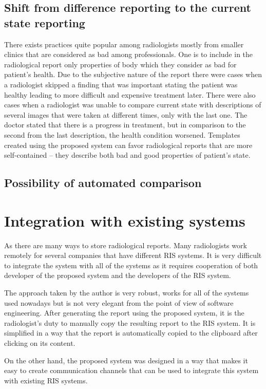 \documentclass[12pt, twoside, openany]{report}
\theoremstyle{definition}
\begin{document}
\subsection{Shift from difference reporting to the current state reporting}
There exists practices quite popular among radiologists mostly from smaller clinics that are considered as bad among professionals. One is to include in the radiological report only properties of body which they consider as bad for patient's health. Due to the subjective nature of the report there were cases when a radiologist skipped a finding that was important stating the patient was healthy leading to more difficult and expensive treatment later.
There were also cases when a radiologist was unable to compare current state with descriptions of several images that were taken at different times, only with the last one. The doctor stated that there is a progress in treatment, but in comparison to the second from the last description, the health condition worsened. \cite{risk-management}
Templates created using the proposed system can favor radiological reports that are more self-contained -- they describe both bad and good properties of patient's state.

\subsection{Possibility of automated comparison}


\section{Integration with existing systems}
As there are many ways to store radiological reports. Many radiologists work remotely for several companies that have different RIS systems. It is very difficult to integrate the system with all of the systems as it requires cooperation of both developer of the proposed system and the developers of the RIS system. 

The approach taken by the author is very robust, works for all of the systems used nowadays but is not very elegant from the point of view of software engineering. 
After generating the report using the proposed system, it is the radiologist's duty to manually copy the resulting report to the RIS system. It is simplified in a way that the report is automatically copied to the clipboard after clicking on its content.

On the other hand, the proposed system was designed in a way that makes it easy to create communication channels that can be used to integrate this system with existing RIS systems. 
\end{document}
